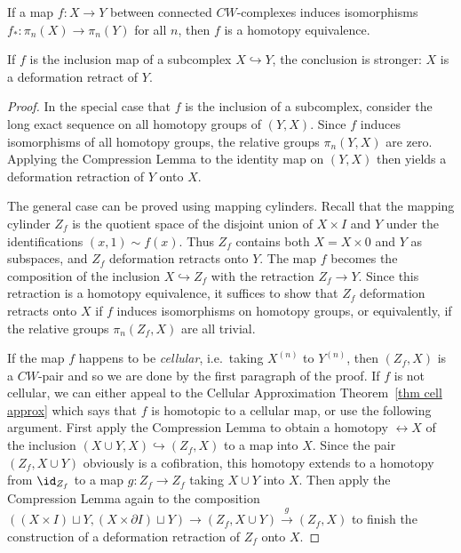 \begin{thm}\label{thm whitehead}
    If a map $f:X\to Y$ between connected $CW$-complexes induces isomorphisms $f_\ast :\pi_n(X)\to \pi_n(Y)$ for all $n$, then $f$ is a homotopy equivalence. 
    
    If $f$ is the inclusion map of a subcomplex $X\hookrightarrow Y$, the conclusion is stronger: $X$ is a deformation retract of $Y$.
\end{thm}
\begin{proof}
    In the special case that $f$ is the inclusion of a subcomplex, consider the long exact sequence on all homotopy groups of $(Y,X)$. Since $f$ induces isomorphisms of all homotopy groups, the relative groups $\pi_n(Y,X)$ are zero. Applying the Compression Lemma to the identity map on $(Y,X)$ then yields a deformation retraction of $Y$ onto $X$.

    The general case can be proved using mapping cylinders. Recall that the mapping cylinder $Z_f$ is the quotient space of the disjoint union of $X\times I$ and $Y$ under the identifications $( x, 1 ) \sim f ( x )$. Thus $Z_f$ contains both $X = X\times { 0 }$ and $Y$ as subspaces, and $Z_f$ deformation retracts onto $Y$. The map $f$ becomes the composition of the inclusion $X\hookrightarrow Z_f$ with the retraction $Z_f\to Y$. Since this retraction is a homotopy equivalence, it suffices to show that $Z_f$ deformation retracts onto $X$ if $f$ induces isomorphisms on homotopy groups, or equivalently, if the relative groups $\pi_n(Z_f,X)$ are all trivial.

    If the map $f$ happens to be \emph{cellular}, i.e.~taking $X^{(n)}$ to $Y^{(n)}$, then $(Z_f,X)$ is a $CW$-pair and so we are done by the first paragraph of the proof. If $f$ is not cellular, we can either appeal to the Cellular Approximation Theorem~\ref{thm cell approx} which says that $f$ is homotopic to a cellular map, or use the following argument. First apply the Compression Lemma to obtain a homotopy $\rel X$ of the inclusion $(X\cup Y,X)\hookrightarrow (Z_f,X)$ to a map into $X$. Since the pair $(Z_f,X\cup Y)$ obviously is a cofibration, this homotopy extends to a homotopy from $\id_{Z_f}$ to a map $g:Z_f\to Z_f$ taking $X\cup Y$ into $X$. Then apply the Compression Lemma again to the composition $((X\times I)\sqcup Y,(X\times\partial I)\sqcup Y)\to (Z_f,X\cup Y)\overset{g}{\to} (Z_f,X)$ to finish the construction of a deformation retraction of $Z_f$ onto $X$.
\end{proof}

